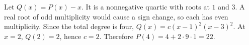 Let $Q(x)=P(x)-x$. It is a nonnegative quartic with roots at $1$ and $3$. A real root of odd multiplicity would cause a sign change, so each has even multiplicity. Since the total degree is four, $Q(x)=c(x-1)^2(x-3)^2$. At $x=2$, $Q(2)=2$, hence $c=2$. Therefore $P(4)=4+2\cdot9\cdot1=\boxed{22}$.
